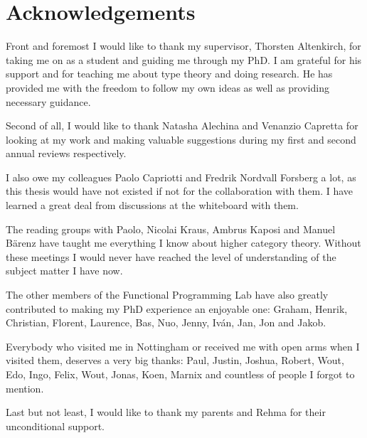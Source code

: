 \chapter*{Acknowledgements}

Front and foremost I would like to thank my supervisor, Thorsten
Altenkirch, for taking me on as a student and guiding me through my
PhD. I am grateful for his support and for teaching me about type
theory and doing research. He has provided me with the freedom to
follow my own ideas as well as providing necessary guidance.

Second of all, I would like to thank Natasha Alechina and Venanzio
Capretta for looking at my work and making valuable suggestions during
my first and second annual reviews respectively.

I also owe my colleagues Paolo Capriotti and Fredrik Nordvall Forsberg
a lot, as this thesis would have not existed if not for the
collaboration with them. I have learned a great deal from discussions
at the whiteboard with them.

The reading groups with Paolo, Nicolai Kraus, Ambrus Kaposi and Manuel
Bärenz have taught me everything I know about higher category
theory. Without these meetings I would never have reached the level of
understanding of the subject matter I have now.

The other members of the Functional Programming Lab have also greatly
contributed to making my PhD experience an enjoyable one: Graham,
Henrik, Christian, Florent, Laurence, Bas, Nuo, Jenny, Iv\'an, Jan,
Jon and Jakob.

Everybody who visited me in Nottingham or received me with open arms
when I visited them, deserves a very big thanks: Paul, Justin, Joshua,
Robert, Wout, Edo, Ingo, Felix, Wout, Jonas, Koen, Marnix and
countless of people I forgot to mention.

Last but not least, I would like to thank my parents and Rehma for
their unconditional support.
